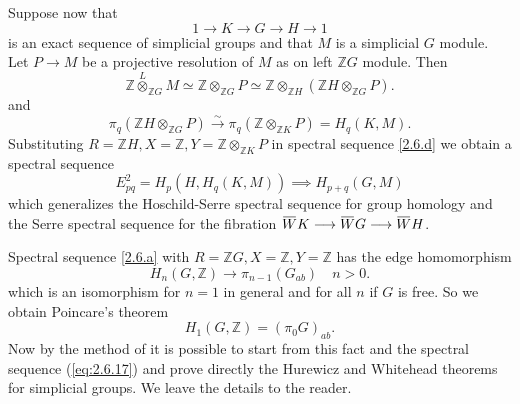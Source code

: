 \documentclass[../main]{subfiles}
\begin{document}
Suppose now that \[1 \longrightarrow  K \longrightarrow  G \longrightarrow  H \longrightarrow  1\]
is an exact sequence of simplicial groups and that $M$ is a simplicial $G$ module. Let $P \longrightarrow  M$ be a projective resolution of $M$ as on left $\mathbb{Z}G$ module. Then 
\[ 
\mathbb{Z} \overset{L}{\otimes}_{\mathbb{Z} G} M \simeq \mathbb{Z} \otimes_{\mathbb{Z}G} P \simeq \mathbb{Z} \otimes_{\mathbb{Z}H} (\mathbb{Z}H \otimes_{\mathbb{Z}G}P)
.\]
and 
\[ 
\pi_q (\mathbb{Z}H \otimes_{\mathbb{Z}G}P) \overset{\sim}{\to}\pi_q (\mathbb{Z} \otimes_{\mathbb{Z}K}P) = H_q (K, M)
.\]
Substituting $R = \mathbb{Z}H, X = \mathbb{Z}, Y = \mathbb{Z} \otimes_{\mathbb{Z}K} P$ in spectral sequence \ref{2.6.d} we obtain a spectral sequence 
\begin{equation}\label{eq:2.6.17}\tag{17}
E_{pq}^2 = H_p (H, H_q(K, M)) \implies H_{p+q} (G, M)
\end{equation}
which generalizes the Hoschild-Serre spectral sequence for group homology and the Serre spectral sequence for the fibration $\xoverline{W}K \longrightarrow  \xoverline{W}G \longrightarrow  \xoverline{W} H$.

Spectral sequence \ref{2.6.a} with $R = \mathbb{Z}G, X = \mathbb{Z}, Y = \mathbb{Z}$ has the edge homomorphism
\[ 
H_n (G, \mathbb{Z}) \longrightarrow  \pi_{n-1} (G_{ab}) \quad n > 0
.\]
which is an isomorphism for $n = 1$ in general and for all $n$ if $G$ is free. So we obtain Poincare's theorem 
\[ 
H_1 (G, \mathbb{Z}) = (\pi_0 G)_{ab}
.\]
Now by the method of \cite{serre_groupes_1953} it is possible to start from this fact and the spectral sequence (\ref{eq:2.6.17}) and prove directly the Hurewicz and Whitehead theorems for simplicial groups. We leave the details to the reader.
\end{document}
